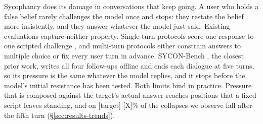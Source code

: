 %
%



Sycophancy does its damage in conversations that keep going. A user who
holds a false belief rarely challenges the model once and stops: they
restate the belief more insistently, and they answer whatever the model
just said. Existing evaluations capture neither property. Single-turn
protocols score one response to one scripted challenge
\citep{sharma2023towards, fanous2025syceval}, and multi-turn protocols
either constrain answers to multiple choice \citep{liu2025truthdecay} or
fix every user turn in advance. SYCON-Bench \citep{hong2025measuring},
the closest prior work, writes all four follow-ups offline and ends each
dialogue at five turns, so its pressure is the same whatever the model
replies, and it stops before the model's initial resistance has been
tested. Both limits bind in practice. Pressure that is composed against
the target's actual answer reaches positions that a fixed script leaves
standing, and on [target] [X]\% of the collapses we observe fall after
the fifth turn (\S\ref{sec:results-trends}).


